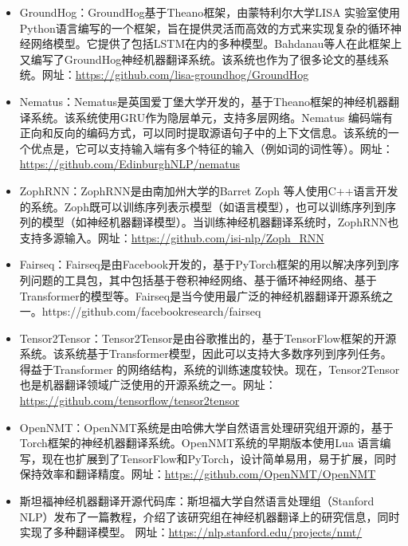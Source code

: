 \begin{itemize}
\vspace{0.5em}
\item GroundHog：GroundHog\cite{bahdanau2014neural}基于Theano\cite{al2016theano}框架，由蒙特利尔大学LISA 实验室使用Python语言编写的一个框架，旨在提供灵活而高效的方式来实现复杂的循环神经网络模型。它提供了包括LSTM在内的多种模型。Bahdanau等人在此框架上又编写了GroundHog神经机器翻译系统。该系统也作为了很多论文的基线系统。网址：\url{https://github.com/lisa-groundhog/GroundHog}
\vspace{0.5em}
\item Nematus：Nematus\cite{DBLP:journals/corr/SennrichFCBHHJL17}是英国爱丁堡大学开发的，基于Theano框架的神经机器翻译系统。该系统使用GRU作为隐层单元，支持多层网络。Nematus 编码端有正向和反向的编码方式，可以同时提取源语句子中的上下文信息。该系统的一个优点是，它可以支持输入端有多个特征的输入（例如词的词性等）。网址：\url{https://github.com/EdinburghNLP/nematus}
\vspace{0.5em}
\item ZophRNN：ZophRNN\cite{zoph2016simple}是由南加州大学的Barret Zoph 等人使用C++语言开发的系统。Zoph既可以训练序列表示模型（如语言模型），也可以训练序列到序列的模型（如神经机器翻译模型）。当训练神经机器翻译系统时，ZophRNN也支持多源输入。网址：\url{https://github.com/isi-nlp/Zoph\_RNN}
\vspace{0.5em}
\item Fairseq：Fairseq\cite{Ottfairseq}是由Facebook开发的，基于PyTorch框架的用以解决序列到序列问题的工具包，其中包括基于卷积神经网络、基于循环神经网络、基于Transformer的模型等。Fairseq是当今使用最广泛的神经机器翻译开源系统之一。https://github.com/facebookresearch/fairseq
\vspace{0.5em}
\item Tensor2Tensor：Tensor2Tensor\cite{VaswaniTensor2Tensor}是由谷歌推出的，基于TensorFlow框架的开源系统。该系统基于Transformer模型，因此可以支持大多数序列到序列任务。得益于Transformer 的网络结构，系统的训练速度较快。现在，Tensor2Tensor也是机器翻译领域广泛使用的开源系统之一。网址：\url{https://github.com/tensorflow/tensor2tensor}
\vspace{0.5em}
\item OpenNMT：OpenNMT\cite{KleinOpenNMT}系统是由哈佛大学自然语言处理研究组开源的，基于Torch框架的神经机器翻译系统。OpenNMT系统的早期版本使用Lua 语言编写，现在也扩展到了TensorFlow和PyTorch，设计简单易用，易于扩展，同时保持效率和翻译精度。网址：\url{https://github.com/OpenNMT/OpenNMT}
\vspace{0.5em}
\item 斯坦福神经机器翻译开源代码库：斯坦福大学自然语言处理组（Stanford NLP）发布了一篇教程，介绍了该研究组在神经机器翻译上的研究信息，同时实现了多种翻译模型\cite{luong2016acl_hybrid}。 网址：\url{https://nlp.stanford.edu/projects/nmt/}

\end{itemize}
